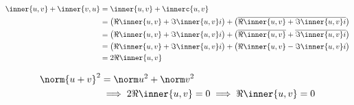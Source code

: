\begin{align*}
    \inner{u,v} + \inner{v,u} &= \inner{u,v} + \innerc{u,v} \\
    &= \big( \Re\inner{u,v} + \Im \inner{u,v}i \big) + \big( \overline{\Re \inner{u,v}  +  \Im \inner{u,v}i} \big) \\
    &= \big( \Re \inner{u,v} + \Im \inner{u,v}i \big) + \big( \overline{\Re \inner{u,v} } + \overline{ \Im \inner{u,v}i} \big) \\
    &= \big( \Re \inner{u,v} + \Im \inner{u,v}i \big) + \big( \Re \inner{u,v} - \Im \inner{u,v}i \big) \\
    &= 2 \Re \inner{u,v}
\end{align*}

\begin{align*}
    \norm{u+v}^2 &= \norm u^2 + \norm v^2 \\
    &\implies 2 \Re \inner{u,v} = 0 \implies \Re \inner{u,v} = 0
\end{align*}